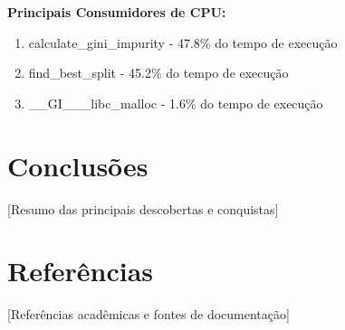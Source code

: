 \documentclass[a4paper,11pt]{article}
\begin{document}
\textbf{Principais Consumidores de CPU:}


\begin{enumerate}
    \item calculate\_gini\_impurity - 47.8\% do tempo de execução
    \item find\_best\_split - 45.2\% do tempo de execução
    \item \_\_GI\_\_\_libc\_malloc - 1.6\% do tempo de execução
\end{enumerate}




\section{Conclusões}

[Resumo das principais descobertas e conquistas]


\section{Referências}

[Referências acadêmicas e fontes de documentação]
\end{document}
